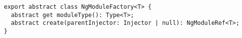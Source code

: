 \begin{verbatim}
export abstract class NgModuleFactory<T> {
  abstract get moduleType(): Type<T>;
  abstract create(parentInjector: Injector | null): NgModuleRef<T>;
}
\end{verbatim}
